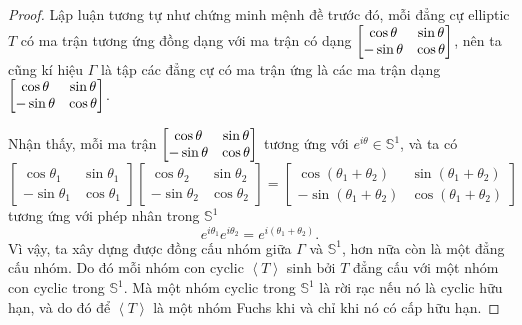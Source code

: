 \begin{proof}
    Lập luận tương tự như chứng minh mệnh đề trước đó, mỗi đẳng cự elliptic $T$ có ma trận tương ứng đồng dạng với ma trận có dạng $\begin{bmatrix} \cos{\theta} & \sin{\theta}\\ -\sin{\theta} & \cos{\theta} \end{bmatrix}$, nên ta cũng kí hiệu $\Gamma$ là tập các đẳng cự có ma trận ứng là các ma trận dạng $\begin{bmatrix} \cos{\theta} & \sin{\theta}\\ -\sin{\theta} & \cos{\theta} \end{bmatrix}$. 

    Nhận thấy, mỗi ma trận $\begin{bmatrix} \cos{\theta} & \sin{\theta}\\ -\sin{\theta} & \cos{\theta} \end{bmatrix}$ tương ứng với $e^{i\theta} \in \mathbb{S}^1$, và ta có
    \[\begin{bmatrix}
        \cos \theta_1 & \sin \theta_1\\
        -\sin \theta_1 & \cos \theta_1
    \end{bmatrix}\begin{bmatrix}
        \cos \theta_2 & \sin \theta_2\\
        -\sin \theta_2 & \cos \theta_2
    \end{bmatrix} = \begin{bmatrix}
        \cos (\theta_1+\theta_2) & \sin (\theta_1+\theta_2)\\
        -\sin (\theta_1+\theta_2) & \cos (\theta_1+\theta_2)
    \end{bmatrix}\]
    tương ứng với phép nhân trong $\mathbb{S}^1$
    \[e^{i\theta_1}e^{i\theta_2} = e^{i(\theta_1 + \theta_2)}.\]
    Vì vậy, ta xây dựng được đồng cấu nhóm giữa $\Gamma$ và $\mathbb{S}^1$, hơn nữa còn là một đẳng cấu nhóm. Do đó mỗi nhóm con cyclic $\left<T\right>$ sinh bởi $T$ đẳng cấu với một nhóm con cyclic trong $\mathbb{S}^1$. Mà một nhóm cyclic trong $\mathbb{S}^1$ là rời rạc nếu nó là cyclic hữu hạn, và do đó để $\left<T\right>$ là một nhóm Fuchs khi và chỉ khi nó có cấp hữu hạn.
\end{proof}

